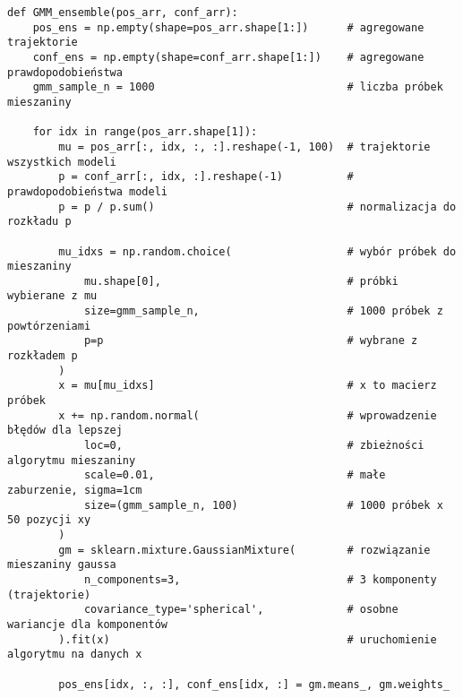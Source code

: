 \begin{verbatim}
def GMM_ensemble(pos_arr, conf_arr):
    pos_ens = np.empty(shape=pos_arr.shape[1:])      # agregowane trajektorie
    conf_ens = np.empty(shape=conf_arr.shape[1:])    # agregowane prawdopodobieństwa
    gmm_sample_n = 1000                              # liczba próbek mieszaniny

    for idx in range(pos_arr.shape[1]):
        mu = pos_arr[:, idx, :, :].reshape(-1, 100)  # trajektorie wszystkich modeli
        p = conf_arr[:, idx, :].reshape(-1)          # prawdopodobieństwa modeli
        p = p / p.sum()                              # normalizacja do rozkładu p

        mu_idxs = np.random.choice(                  # wybór próbek do mieszaniny
            mu.shape[0],                             # próbki wybierane z mu
            size=gmm_sample_n,                       # 1000 próbek z powtórzeniami
            p=p                                      # wybrane z rozkładem p
        )
        x = mu[mu_idxs]                              # x to macierz próbek
        x += np.random.normal(                       # wprowadzenie błędów dla lepszej
            loc=0,                                   # zbieżności algorytmu mieszaniny
            scale=0.01,                              # małe zaburzenie, sigma=1cm
            size=(gmm_sample_n, 100)                 # 1000 próbek x 50 pozycji xy
        )
        gm = sklearn.mixture.GaussianMixture(        # rozwiązanie mieszaniny gaussa
            n_components=3,                          # 3 komponenty (trajektorie)
            covariance_type='spherical',             # osobne wariancje dla komponentów
        ).fit(x)                                     # uruchomienie algorytmu na danych x

        pos_ens[idx, :, :], conf_ens[idx, :] = gm.means_, gm.weights_
\end{verbatim}